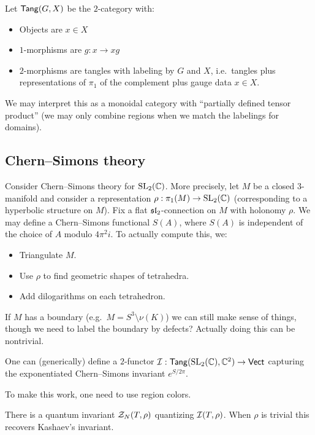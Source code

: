 \documentclass{amsart}
\begin{document}
Let $\Tang(G, X)$ be the $2$-category with:
\begin{itemize}
  \item Objects are $x \in X$
  \item $1$-morphisms are $g: x \to xg$
  \item $2$-morphisms are tangles with labeling by $G$ and $X$, i.e.\ tangles plus representations of $\pi_1$ of the complement plus gauge data $x \in X$.
\end{itemize}

We may interpret this as a monoidal category with ``partially defined tensor product'' (we may only combine regions when we match the labelings for domains).

\subsection{Chern--Simons theory}

Consider Chern--Simons theory for $\SL_2(\CC)$.
More precisely, let $M$ be a closed $3$-manifold and consider a representation $\rho: \pi_1(M) \to \SL_2(\CC)$ (corresponding to a hyperbolic structure on $M$).
Fix a flat $\sl_2$-connection on $M$ with holonomy $\rho$.
We may define a Chern--Simons functional $S(A)$, where $S(A)$ is independent of the choice of $A$ modulo $4 \pi^2 i$.
To actually compute this, we:
\begin{itemize}
\item Triangulate $M$.
\item Use $\rho$ to find geometric shapes of tetrahedra.
\item Add dilogarithms on each tetrahedron.
\end{itemize}

If $M$ has a boundary (e.g.\ $M = S^3 \setminus \nu(K)$) we can still make sense of things, though we need to label the boundary by defects?
Actually doing this can be nontrivial.

\begin{thm}
  One can (generically) define a $2$-functor $\Ic: \Tang(\SL_2(\CC), \CC^2) \to \Vect$ capturing the exponentiated Chern--Simons invariant $e^{S/2\pi}$.
\end{thm}

To make this work, one need to use region colors.

\begin{thm}[MS--Reshetikhin]
  There is a quantum invariant $\Zc_N(T, \rho)$ quantizing $\Ic(T, \rho)$.
  When $\rho$ is trivial this recovers Kashaev's invariant.
\end{thm}
\end{document}
